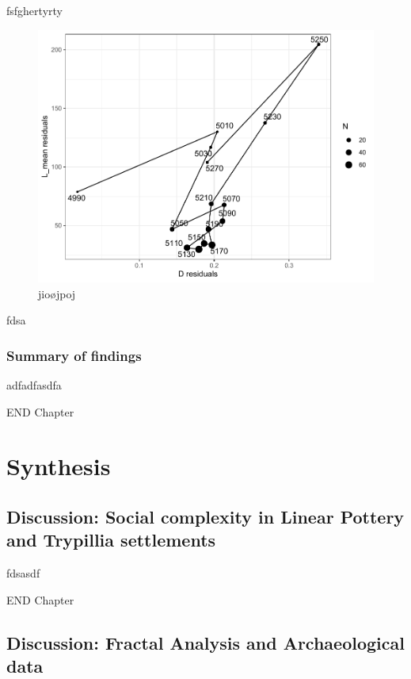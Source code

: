 \documentclass[
  12pt,
]{book}
\begin{document}
fsfghertyrty



\begin{figure}

{\centering \includegraphics[width=0.9\linewidth]{bookdown-demo_files/figure-latex/09-time-resid-1} 

}

\caption{jioøjpoj}\label{fig:09-time-resid}
\end{figure}

fdsa

\hypertarget{summary-of-findings-1}{%
\section{Summary of findings}\label{summary-of-findings-1}}

adfadfasdfa

END Chapter

\hypertarget{part-synthesis}{%
\part{Synthesis}\label{part-synthesis}}

\hypertarget{disc-results}{%
\chapter{Discussion: Social complexity in Linear Pottery and Trypillia settlements}\label{disc-results}}

fdsasdf

END Chapter

\hypertarget{disc-methods}{%
\chapter{Discussion: Fractal Analysis and Archaeological data}\label{disc-methods}}
\end{document}
